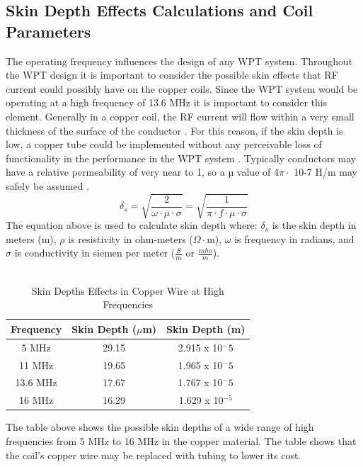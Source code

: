\documentclass[12pt]{article}
\begin{document}
\subsection{Skin Depth Effects Calculations and Coil Parameters}

\indent
The operating frequency influences the design of any WPT system. Throughout the WPT design it is important to consider the possible skin effects that RF current could possibly have on the copper coils. Since the WPT system would be operating at a high frequency of 13.6 MHz it is important to consider this element. Generally in a copper coil, the RF current will flow within a very small thickness of the surface of the conductor \cite{optCoilSize}. For this reason, if the skin depth is low, a copper tube could be implemented without any perceivable loss of functionality in the performance in the WPT system \cite{optCoilSize}. Typically conductors may have a relative permeability of very near to 1, so a µ value of 4$\pi \cdot$ 10-7 H/m may safely be assumed \cite{rfCond}.
\begin{equation}
\delta_s = \sqrt{\frac{2}{\omega\cdot\mu\cdot\sigma}} = \sqrt{\frac{1}{\pi\cdot f\cdot\mu\cdot\sigma}}
\end{equation}
\indent
The equation above is used to calculate skin depth \cite{skin} where: $\delta_s$ is the skin depth in meters (m), $\rho$ is resistivity in ohm-meters ($\Omega \cdot$m), $\omega$ is frequency in radians, and $\sigma$ is conductivity in siemen per meter ($\frac{S}{m}$ or $\frac{mho}{m}$).\\ 
\hfill \\

\begin{table}[h!]
\centering
\caption{Skin Depths Effects in Copper Wire at High Frequencies}
\begin{tabular}{| c | c | c |}
\hline
Frequency & Skin Depth ($\mu$m) & Skin Depth (m) \\
\hline
5 MHz & 29.15 & 2.915 x 10${^-5}$ \\
\hline
11 MHz & 19.65 & 1.965 x 10${^-5}$ \\
\hline
13.6 MHz & 17.67 & 1.767 x 10${^-5}$ \\
\hline
16 MHz & 16.29 & 1.629 x 10$^{-5}$ \\
\hline
\end{tabular}
\end{table}

\indent
The table above shows the possible skin depths of a wide range of high frequencies from 5 MHz to 16 MHz in the copper material. The table shows that the coil’s copper wire may be replaced with tubing to lower its cost.\\
\end{document}
